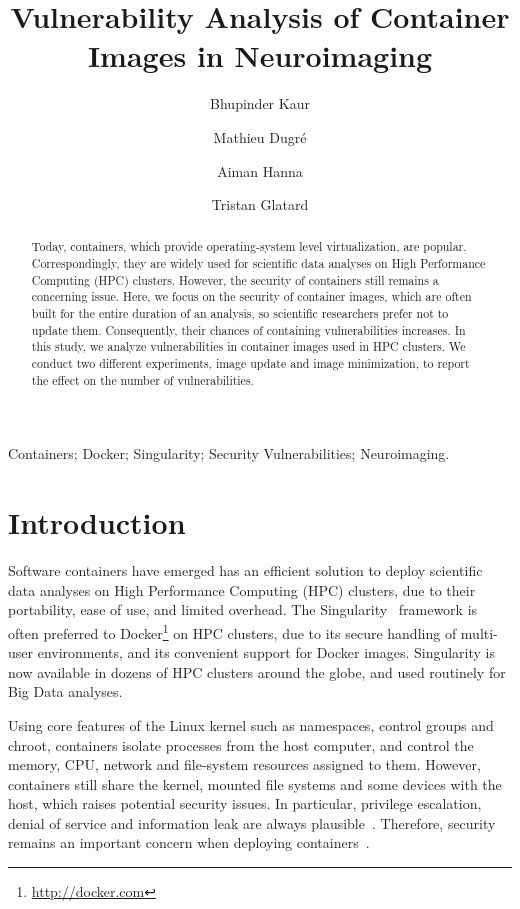 \documentclass[a4paper,num-refs]{oup-contemporary}
\title{Vulnerability Analysis of Container Images in Neuroimaging}
\begin{document}
\author[1]{Bhupinder Kaur}
\author[1]{Mathieu Dugr\'e}
\author[1]{Aiman Hanna}
\author[1]{Tristan Glatard}


\maketitle

\begin{abstract}

Today, containers, which provide operating-system level virtualization, are
popular. Correspondingly, they are widely used for scientific data analyses on 
High Performance Computing (HPC) clusters. However, the security of containers
still remains a concerning issue. Here, we focus on the security of container
images, which are often built for the entire
duration of an analysis, so scientific researchers prefer not to update
them. Consequently, their chances of containing vulnerabilities increases.  
In this study, we analyze vulnerabilities in container images used in 
HPC clusters.
We conduct two different
experiments, image update and image minimization, to report the effect 
on the number of vulnerabilities.

\end{abstract}

\begin{keywords}
Containers; Docker; Singularity; Security Vulnerabilities; Neuroimaging.
\end{keywords}

\section{Introduction}

Software containers have emerged has an efficient solution to deploy
scientific data analyses on High Performance Computing (HPC) clusters, due
to their portability, ease of use, and limited overhead. The
Singularity~\cite{kurtzer2017singularity} framework is often preferred to
Docker\footnote{\url{http://docker.com}} on HPC clusters, due to its
secure handling of multi-user environments, and its convenient support for
Docker images. Singularity is now available in dozens of HPC
clusters around the globe, and used routinely for Big Data analyses.

Using core features of the Linux kernel such as namespaces, control groups
and chroot, containers isolate processes from the
host computer,  
and control the memory, CPU, network and file-system resources assigned to
them. However, containers still share the kernel, mounted file systems and
some devices with the host, which raises potential security issues. In
particular, privilege escalation, denial of service and information leak
are always plausible~\cite{gantikow2016providing}. Therefore, security remains 
an important concern when deploying containers~\cite{bettini2015vulnerability}.
\end{document}
